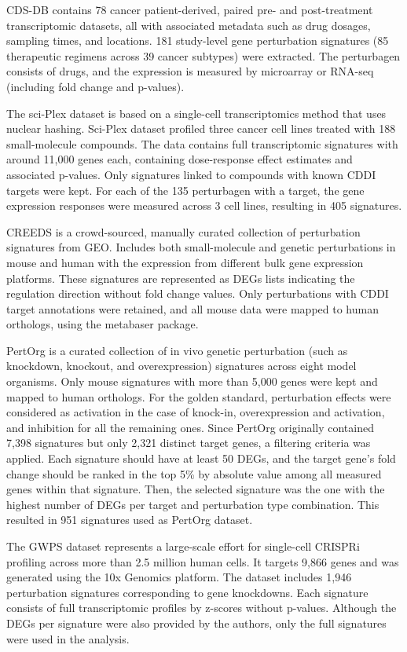 \gls{CDS-DB} contains 78 cancer patient-derived, paired pre- and post-treatment transcriptomic datasets, all with associated metadata such as drug dosages, sampling times, and locations. 181 study-level gene perturbation signatures (85 therapeutic regimens across 39 cancer subtypes) were extracted. The perturbagen consists of drugs, and the expression is measured by microarray or \gls{RNA-seq} (including fold change and p-values). 

The sci-Plex dataset is based on a single-cell transcriptomics method that uses nuclear hashing. Sci-Plex dataset profiled three cancer cell lines treated with 188 small-molecule compounds. The data contains full transcriptomic signatures with around 11,000 genes each, containing dose-response effect estimates and associated p-values. Only signatures linked to compounds with known \gls{CDDI} targets were kept. For each of the 135 perturbagen with a target, the gene expression responses were measured across 3 cell lines, resulting in 405 signatures. 

\gls{CREEDS} is a crowd-sourced, manually curated collection of perturbation signatures from \gls{GEO}. Includes both small-molecule and genetic perturbations in mouse and human with the expression from different bulk gene expression platforms. These signatures are represented as \gls{DEGs} lists indicating the regulation direction without fold change values. Only perturbations with \gls{CDDI} target annotations were retained, and all mouse data were mapped to human orthologs, using the metabaser package.

PertOrg is a curated collection of in vivo genetic perturbation (such as knockdown, knockout, and overexpression) signatures across eight model organisms. Only mouse signatures with more than 5,000 genes were kept and mapped to human orthologs. For the golden standard, perturbation effects were considered as activation in the case  of knock-in, overexpression and activation, and inhibition for all the remaining ones. Since PertOrg originally contained 7,398 signatures but only 2,321 distinct target genes, a filtering criteria was applied. Each signature should have at least 50 \gls{DEGs}, and the target gene's fold change should be ranked in the top 5\% by absolute value among all measured genes within that signature. Then, the selected signature was the one with the highest number of \gls{DEGs} per target and perturbation type combination. This resulted in 951 signatures used as PertOrg dataset.

The \gls{GWPS} dataset represents a large-scale effort for single-cell \gls{CRISPR}i profiling across more than 2.5 million human cells. It targets 9,866 genes and was generated using the 10x Genomics platform. The dataset includes 1,946 perturbation signatures corresponding to gene knockdowns. Each signature consists of full transcriptomic profiles by z-scores without p-values. Although the \gls{DEGs} per signature were also provided by the authors, only the full signatures were used in the analysis.

